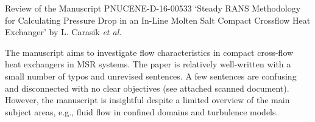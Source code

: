 \documentclass[14pt,twoside]{report}
\begin{document}
\afterpage{%
    \clearpage%
    \thispagestyle{empty}%
    \begin{landscape}%
        \centering %
        \vfill
    \end{landscape}
    \clearpage%
}
\vfill 
\clearpage


\begin{center}
  {\Large Review of the Manuscript PNUCENE-D-16-00533 `Steady RANS Methodology for Calculating Pressure Drop in an In-Line Molten Salt Compact Crossflow Heat Exchanger' by L. Carasik {\it et al.}}
\end{center}

\medskip
The manuscript aims to investigate flow characteristics in compact cross-flow heat exchangers in MSR systems. The paper is relatively well-written with a small number of typos and unrevised sentences. A few sentences are confusing and disconnected with no clear objectives (see attached scanned document).  However, the manuscript is insightful despite a limited overview of the main subject areas, e.g., fluid flow in confined domains and turbulence models.
\end{document}
